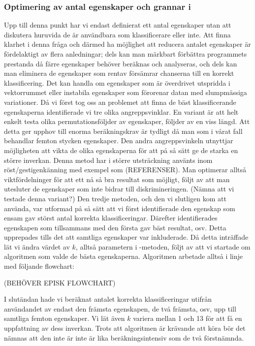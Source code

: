 \documentclass[../rapport_MVEX01-11-05]{subfiles}
\begin{document}
\subsubsection{Optimering av antal egenskaper och grannar i \knn}
Upp till denna punkt har vi endast definierat ett antal egenskaper utan att
diskutera huruvida de är användbara som klassificerare eller inte. Att finna
klarhet i denna fråga och därmed ha möjlighet att reducera antalet egenskaper är
fördelaktigt av flera anledningar; dels kan man märkbart förbättra programmets
prestanda då färre egenskaper behöver beräknas och analyseras, och dels kan man
eliminera de egenskaper som rentav försämrar chanserna till en korrekt
klassificering. Det kan handla om egenskaper som är överdrivet utspridda i
vektorrummet eller instabila egenskaper som förorenar datan med slumpmässiga
variationer. Då vi först tog oss an problemet att finna de bäst klassificerande
egenskaperna identifierade vi tre olika angreppsvinklar. En variant är att helt
enkelt testa olika permutationsföljder av egenskaper, följder av en viss längd.
Att detta ger upphov till enorma beräkningskrav är tydligt då man som i vårat
fall behandlar femton stycken egenskaper. Den andra angreppsvinkeln utnyttjar
möjligheten att vikta de olika egenskaperna för att på så sätt ge de starka en
större inverkan. Denna metod har i större utsträckning använts inom
röst/gestigenkänning med exempel som (REFERENSER). Man optimerar alltså
viktfördelninger för att ett nå så bra resultat som möjligt, följt av att man
utesluter de egenskaper som inte bidrar till diskrimineringen. (Nämna att vi
testade denna variant?) Den tredje metoden, och den vi slutligen kom att
använda, var utformad på så sätt att vi först identifierade den egenskap som
ensam gav störst antal korrekta klassificeringar. Därefter identifierades
egenskapen som tillsammans med den första gav bäst resultat, osv. Detta
upprepades tills det att samtliga egenskaper var inkluderade. Då detta
inträffade lät vi ändra värdet av $k$, alltså parametern i \knn-metoden, följt av
att vi startade om algoritmen som valde de bästa egenskaperna. Algoritmen
arbetade alltså i linje med följande flowchart:  

(BEHÖVER EPISK FLOWCHART)

I slutändan hade vi beräknat antalet korrekta klassificeringar utifrån
användandet av endast den främsta egenskapen, de två främsta, osv, upp till
samtliga femton egenskaper. Vi lät även $k$ variera mellan 1 och 13 för att få
en uppfattning av dess inverkan. Trots att algoritmen är krävande att köra bör
det nämnas att den inte är inte är lika beräkningsintensiv som de två
förstnämnda. 
\end{document}
